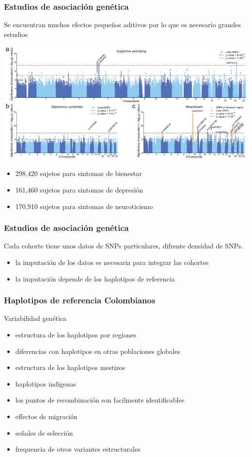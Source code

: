 \documentclass{beamer}\usepackage[]{graphicx}\usepackage[]{color}
\begin{document}
\begin{frame}[fragile]
\frametitle{Estudios de asociaci\'on gen\'etica}

Se encuentran muchos efectos pequeños aditivos por lo que es necesario grandes estudios 
\begin{center}
\includegraphics[width=0.7\linewidth]{neurotic.jpg}
\end{center}

\begin{itemize}
\item  298,420 sujetos para sintomas de bienestar
\item  161,460 sujetos para sintomas de depresi\'on
\item  170,910 sujetos para sintomas de neuroticismo
\end{itemize}
\end{frame}



\begin{frame}[fragile]
\frametitle{Estudios de asociaci\'on gen\'etica}
Cada cohorte tiene unos datos de SNPs particulares, difrente densidad de SNPs.
\begin{itemize}
\item  la imputaci\'on de los datos es necesaria para integrar las cohortes
\item  la imputaci\'on depende de los haplotipos de referencia
\end{itemize}
\end{frame}



\begin{frame}[fragile]
\frametitle{Haplotipos de referencia Colombianos}

Variabilidad gen\'etica
\begin{itemize}
\item  estructura de los haplotipos por regiones
\item  diferencias con haplotipos en otras poblaciones globales
\item  estructura de los haplotipos mestizos
\item  haplotipos indigenas
\item  los puntos de recombinaci\'on son facilmente identificables 
\item  effectos de migraci\'on
\item  señales de selecci\'on
\item  frequencia de otros variantes estructurales
\end{itemize}

\end{frame}
\end{document}
